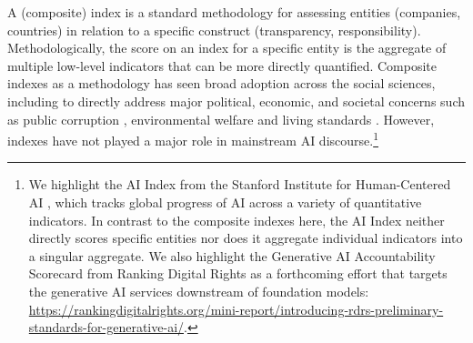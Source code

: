 \documentclass[screen, authorversion, acmsmall]{acmart}
\begin{document}
A (composite) index is a standard methodology \citep{oecd2008handbook, greco2019methodological} for assessing entities (\eg companies, countries) in relation to a specific construct (\eg transparency, responsibility).
Methodologically, the score on an index for a specific entity is the aggregate of multiple low-level indicators that can be more directly quantified. 
Composite indexes as a methodology has seen broad adoption across the social sciences, including to directly address major political, economic, and societal concerns such as public corruption \citep[\eg Transparency International’s Corruption Perceptions Index;][]{ti2022corrupt}, environmental welfare \citep[\eg the World Economic Forum’s Environmental Sustainability Index;][]{whitford2009political} and living standards \citep[\eg the United Nations Development Programme’s Human Development Index;][]{hopkins1991human}. 
However, indexes have not played a major role in mainstream AI discourse.\footnote{We highlight the AI Index from the Stanford Institute for Human-Centered AI \citep{maslej2023ai, zhang2022ai}, which tracks global progress of AI across a variety of quantitative indicators. 
In contrast to the composite indexes here, the AI Index neither directly scores specific entities nor does it aggregate individual indicators into a singular aggregate.
We also highlight the Generative AI Accountability Scorecard from Ranking Digital Rights as a forthcoming effort that targets the generative AI services downstream of foundation models: \url{https://rankingdigitalrights.org/mini-report/introducing-rdrs-preliminary-standards-for-generative-ai/}.
}
\end{document}
